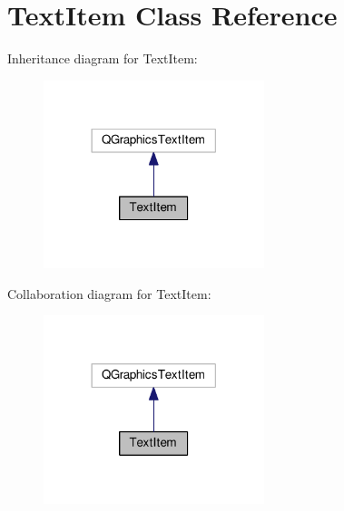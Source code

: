\hypertarget{class_text_item}{}\section{Text\+Item Class Reference}
\label{class_text_item}


Inheritance diagram for Text\+Item\+:
\nopagebreak
\begin{figure}[H]
\begin{center}
\leavevmode
\includegraphics[width=182pt]{class_text_item__inherit__graph}
\end{center}
\end{figure}


Collaboration diagram for Text\+Item\+:
\nopagebreak
\begin{figure}[H]
\begin{center}
\leavevmode
\includegraphics[width=182pt]{class_text_item__coll__graph}
\end{center}
\end{figure}
